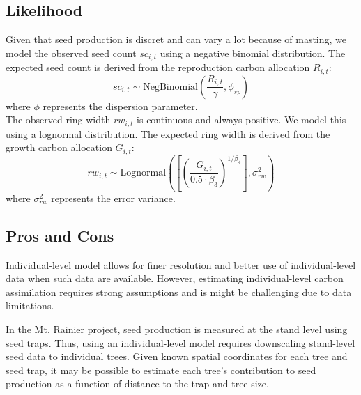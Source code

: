 \documentclass[11pt]{article}
\begin{document}
\subsection{Likelihood}
Given that seed production is discret and can vary a lot because of masting, we model the observed seed count $sc_{i,t}$ using a negative binomial distribution. The expected seed count is derived from the reproduction carbon allocation $R_{i,t}$:
\begin{equation}
    sc_{i,t} \sim \text{NegBinomial} \left( \frac{R_{i,t}}{\gamma}, \phi_{sp} \right)
\end{equation}
where $\phi$ represents the dispersion parameter.\\

The observed ring width $rw_{i,t}$ is continuous and always positive. We model this using a lognormal distribution. The expected ring width is derived from the growth carbon allocation $G_{i,t}$:
\begin{equation}
    rw_{i,t} \sim \text{Lognormal} \left( \left[ \left( \frac{G_{i,t}}{0.5 \cdot \beta_{3}} \right)^{1/\beta_{4}} \right], \sigma^2_{rw} \right)
\end{equation}
where $\sigma^2_{rw}$ represents the error variance.

\subsection{Pros and Cons}

Individual-level model allows for finer resolution and better use of individual-level data when such data are available. However, estimating individual-level carbon assimilation requires strong assumptions and is might be challenging due to data limitations.

In the Mt. Rainier project, seed production is measured at the stand level using seed traps. Thus, using an individual-level model requires downscaling stand-level seed data to individual trees. Given known spatial coordinates for each tree and seed trap, it may be possible to estimate each tree’s contribution to seed production as a function of distance to the trap and tree size.
\end{document}
